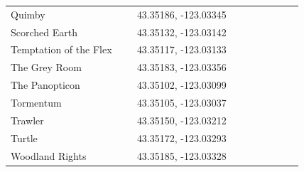 \begin{flushleft}
\begin{center}
\begin{supertabular}{p{0.38\linewidth}p{0.5\linewidth}}
Quimby & 43.35186, -123.03345 \\
Scorched Earth & 43.35132, -123.03142 \\
Temptation of the Flex & 43.35117, -123.03133 \\
The Grey Room & 43.35183, -123.03356 \\
The Panopticon & 43.35102, -123.03099 \\
Tormentum & 43.35105, -123.03037 \\
Trawler & 43.35150, -123.03212 \\
Turtle & 43.35172, -123.03293 \\
Woodland Rights & 43.35185, -123.03328 \\
\end{supertabular}
\end{center}

\end{flushleft}
